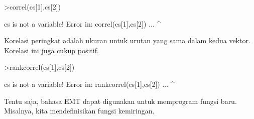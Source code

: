 \documentclass[a4paper,10pt]{article}
\begin{document}
\begin{eulernotebook}
\begin{eulercomment}
\begin{eulercomment}
\begin{eulercomment}
\begin{eulercomment}
\begin{eulercomment}
\begin{eulercomment}
\begin{eulercomment}
\begin{eulercomment}
\begin{eulercomment}
\begin{eulercomment}
\begin{eulercomment}
\begin{eulercomment}
\begin{eulercomment}
\begin{eulercomment}
\begin{eulercomment}
\begin{eulercomment}
\begin{eulercomment}
\begin{eulercomment}
\begin{eulerprompt}
>correl(cs[1],cs[2])
\end{eulerprompt}
\begin{euleroutput}
  cs is not a variable!
  Error in:
  correl(cs[1],cs[2]) ...
              ^
\end{euleroutput}
\begin{eulercomment}
Korelasi peringkat adalah ukuran untuk urutan yang sama dalam kedua
vektor. Korelasi ini juga cukup positif.
\end{eulercomment}
\begin{eulerprompt}
>rankcorrel(cs[1],cs[2])
\end{eulerprompt}
\begin{euleroutput}
  cs is not a variable!
  Error in:
  rankcorrel(cs[1],cs[2]) ...
                  ^
\end{euleroutput}
\begin{eulercomment}
Tentu saja, bahasa EMT dapat digunakan untuk memprogram fungsi baru.
Misalnya, kita mendefinisikan fungsi kemiringan.


\end{eulercomment}
\end{eulercomment}
\end{eulercomment}
\end{eulercomment}
\end{eulercomment}
\end{eulercomment}
\end{eulercomment}
\end{eulercomment}
\end{eulercomment}
\end{eulercomment}
\end{eulercomment}
\end{eulercomment}
\end{eulercomment}
\end{eulercomment}
\end{eulercomment}
\end{eulercomment}
\end{eulercomment}
\end{eulercomment}
\end{eulercomment}
\end{eulernotebook}
\end{document}
